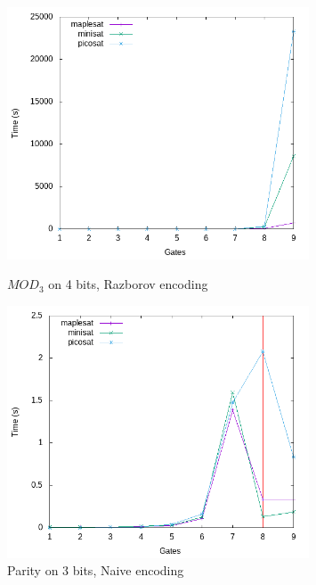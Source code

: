 \documentclass{article}
\begin{document}
\begin{figure}[h!]
\centering
\includegraphics[width=0.8\textwidth]{images/times/4mod3_raz.png}  
\caption{$MOD_3$ on 4 bits, Razborov encoding}
\includegraphics[width=0.8\textwidth]{images/times/3parity_naive.png}  
\caption{Parity on 3 bits, Naive encoding}
\end{figure}
\end{document}
